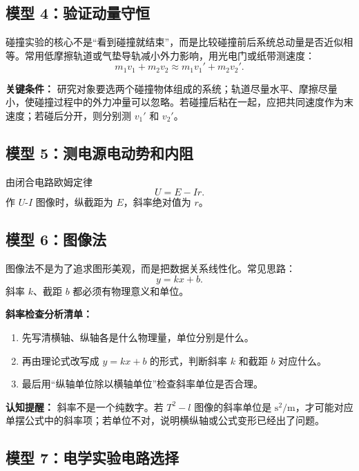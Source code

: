 \subsection*{模型 4：验证动量守恒}

碰撞实验的核心不是“看到碰撞就结束”，而是比较碰撞前后系统总动量是否近似相等。常用低摩擦轨道或气垫导轨减小外力影响，用光电门或纸带测速度：
\[
m_1v_1+m_2v_2\approx m_1v_1'+m_2v_2'.
\]

\begin{center}


\label{fig:momentum-conservation-experiment}
\end{center}

\textbf{关键条件：} 研究对象要选两个碰撞物体组成的系统；轨道尽量水平、摩擦尽量小，使碰撞过程中的外力冲量可以忽略。若碰撞后粘在一起，应把共同速度作为末速度；若碰后分开，则分别测 $v_1'$ 和 $v_2'$。

\subsection*{模型 5：测电源电动势和内阻}

由闭合电路欧姆定律
\[
U=E-Ir.
\]
作 $U$-$I$ 图像时，纵截距为 $E$，斜率绝对值为 $r$。

\subsection*{模型 6：图像法}

图像法不是为了追求图形美观，而是把数据关系线性化。常见思路：
\[
y=kx+b.
\]
斜率 $k$、截距 $b$ 都必须有物理意义和单位。

\textbf{斜率检查分析清单：}
\begin{enumerate}
  \item 先写清横轴、纵轴各是什么物理量，单位分别是什么。
  \item 再由理论式改写成 $y=kx+b$ 的形式，判断斜率 $k$ 和截距 $b$ 对应什么。
  \item 最后用“纵轴单位除以横轴单位”检查斜率单位是否合理。
\end{enumerate}

\textbf{认知提醒：} 斜率不是一个纯数字。若 $T^2-l$ 图像的斜率单位是 $\mathrm{s^2/m}$，才可能对应单摆公式中的斜率项；若单位不对，说明横纵轴或公式变形已经出了问题。

\subsection*{模型 7：电学实验电路选择}

